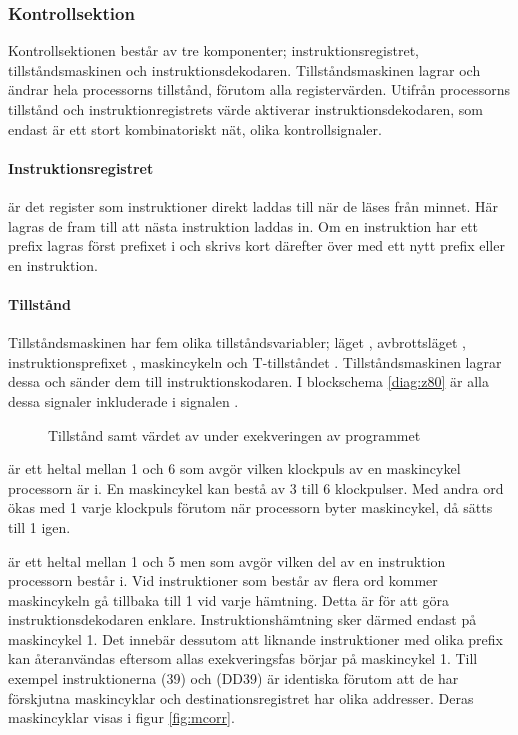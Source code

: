\documentclass[main.tex]{subfiles}
\begin{document}
\subsubsection{Kontrollsektion}
Kontrollsektionen består av tre komponenter; instruktionsregistret,
tillståndsmaskinen och instruktionsdekodaren. Tillståndsmaskinen lagrar och
ändrar hela processorns tillstånd, förutom alla registervärden. Utifrån
processorns tillstånd och instruktionregistrets värde aktiverar
instruktionsdekodaren, som endast är ett stort kombinatoriskt nät, olika
kontrollsignaler.

\paragraph{Instruktionsregistret }
 är det register som instruktioner direkt laddas till när de läses
från minnet. Här lagras de fram till att nästa instruktion laddas in. Om en
instruktion har ett prefix lagras först prefixet i  och skrivs kort
därefter över med ett nytt prefix eller en instruktion.

\paragraph{Tillstånd}
Tillståndsmaskinen har fem olika tillståndsvariabler; läget ,
avbrottsläget , instruktionsprefixet , maskincykeln
 och T-tillståndet . Tillståndsmaskinen lagrar dessa och sänder
dem till instruktionskodaren. I blockschema \ref{diag:z80} är alla dessa
signaler inkluderade i signalen .

\begin{figure}[H]
    \center
    
    \caption{Tillstånd samt värdet av  under exekveringen av
    programmet }
    \label{fig:tim-states}
\end{figure}

 är ett heltal mellan 1 och 6 som avgör vilken klockpuls av en
maskincykel processorn är i. En maskincykel kan bestå av 3 till 6 klockpulser.
Med andra ord ökas  med 1 varje klockpuls förutom när processorn byter
maskincykel, då sätts  till 1 igen.

 är ett heltal mellan 1 och 5 men som avgör vilken del av en
instruktion processorn består i. Vid instruktioner som består av flera ord
kommer maskincykeln gå tillbaka till 1 vid varje hämtning. Detta är för att
göra instruktionsdekodaren enklare. Instruktionshämtning sker därmed endast på
maskincykel 1. Det innebär dessutom att liknande instruktioner med olika prefix
kan återanvändas eftersom allas exekveringsfas börjar på maskincykel 1. Till
exempel instruktionerna  (39) och  (DD39) är
identiska förutom att de har förskjutna maskincyklar och destinationsregistret
har olika addresser. Deras maskincyklar visas i figur \ref{fig:mcorr}.
\end{document}
